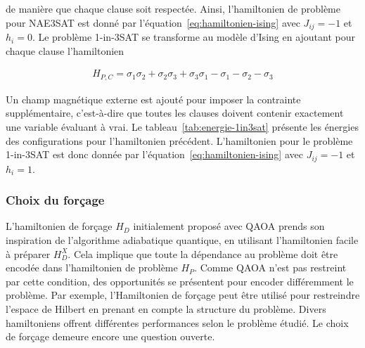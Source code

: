 de manière que chaque clause soit respectée. Ainsi, l'hamiltonien de problème pour NAE3SAT est donné par l'équation~\ref{eq:hamiltonien-ising} avec $J_{ij}=-1$ et $h_{i}=0$. Le problème 1-in-3SAT se transforme au modèle d'Ising en ajoutant pour chaque clause l'hamiltonien

\begin{align*}
   H_{P, C} = \sigma_{1}\sigma_{2} + \sigma_{2}\sigma_{3} + \sigma_{3}\sigma_{1} - \sigma_{1} - \sigma_{2} - \sigma_{3}
\end{align*}

Un champ magnétique externe est ajouté pour imposer la contrainte supplémentaire, c'est-à-dire que toutes les clauses doivent contenir exactement une variable évaluant à vrai. Le tableau~\ref{tab:energie-1in3sat} présente les énergies des configurations pour l'hamiltonien précédent. L'hamiltonien pour le problème 1-in-3SAT est donc donnée par l'équation~\ref{eq:hamiltonien-ising} avec $J_{ij}=-1$ et $h_{i}=1$.


\subsubsection{Choix du forçage}

L'hamiltonien de forçage $H_{D}$ initialement proposé avec QAOA prends son inspiration de l'algorithme adiabatique quantique, en utilisant l'hamiltonien facile à préparer $H_{D}^{X}$. Cela implique que toute la dépendance au problème doit être encodée dans l'hamiltonien de problème $H_{P}$. Comme QAOA n'est pas restreint par cette condition, des opportunités se présentent pour encoder différemment le problème. Par exemple, l'Hamiltonien de forçage peut être utilisé pour restreindre l'espace de Hilbert en prenant en compte la structure du problème. Divers hamiltoniens offrent différentes performances selon le problème étudié. Le choix de forçage demeure encore une question ouverte. 

